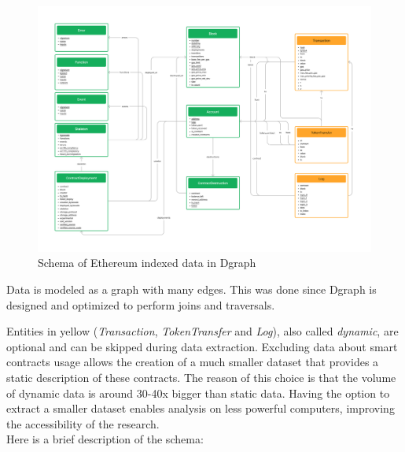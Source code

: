 \begin{figure}[H]
  \centering
  \includegraphics[width=1\textwidth]{Figures/methods/schema.jpg}
  \caption[Schema of Ethereum indexed data in Dgraph]{Schema of Ethereum indexed data in Dgraph}
  \label{fig:schema}
\end{figure}

Data is modeled as a graph with many edges. This was done since Dgraph is designed and optimized to perform joins and traversals.

Entities in yellow (\textit{Transaction}, \textit{TokenTransfer} and \textit{Log}), also called \textit{dynamic}, are optional and can be skipped during data extraction. Excluding data about smart contracts usage allows the creation of a much smaller dataset that provides a static description of these contracts. The reason of this choice is that the volume of dynamic data is around 30-40x bigger than static data. Having the option to extract a smaller dataset enables analysis on less powerful computers, improving the accessibility of the research. \\

\noindent Here is a brief description of the schema:

